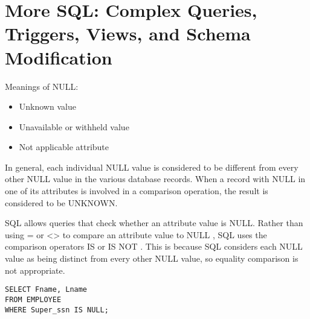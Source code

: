 \chapter{More SQL: Complex Queries, Triggers, Views, and Schema Modification}

    \par Meanings of NULL:
      \begin{itemize}
        \item Unknown value
        \item Unavailable or withheld value
        \item Not applicable attribute
      \end{itemize}
    \par In general, each individual NULL value is considered to be different from every other NULL value in the various database records. When a record with NULL in one of its attributes is involved in a comparison operation, the result is considered to be UNKNOWN.
    \par SQL allows queries that check whether an attribute value is NULL. Rather than using = or <> to compare an attribute value to NULL , SQL uses the comparison operators IS or IS NOT . This is because SQL considers each NULL value as being distinct from every other NULL value, so equality comparison is not appropriate.
      \begin{verbatim}
SELECT Fname, Lname
FROM EMPLOYEE
WHERE Super_ssn IS NULL;
      \end{verbatim}

